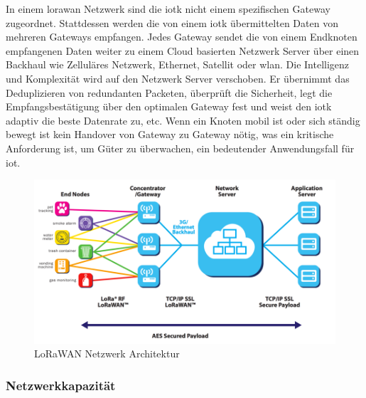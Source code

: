 In einem \gls{lorawan} Netzwerk sind die \gls{iotk} nicht einem spezifischen Gateway zugeordnet. Stattdessen werden die von einem \gls{iotk} übermittelten Daten von mehreren Gateways empfangen. Jedes Gateway sendet die von einem Endknoten empfangenen Daten weiter zu einem Cloud basierten Netzwerk Server über einen Backhaul wie Zelluläres Netzwerk, Ethernet, Satellit oder \gls{wlan}. Die Intelligenz und Komplexität wird auf den Netzwerk Server verschoben. Er übernimmt das Deduplizieren von redundanten Packeten, überprüft die Sicherheit, legt die Empfangsbestätigung über den optimalen Gateway fest und weist den \gls{iotk} adaptiv die beste Datenrate zu, etc. Wenn ein Knoten mobil ist oder sich ständig bewegt ist kein Handover von Gateway zu Gateway nötig, was ein kritische Anforderung ist, um Güter zu überwachen, ein bedeutender Anwendungsfall für \acrshort{iot}.

\begin{figure}[H]
     \centering
        \includegraphics[width=1.0\textwidth]{pictures/lorawan-network-architecture.png}
    \caption{LoRaWAN Netzwerk Architektur}
    \label{fig:LoRaWAN Netzwerk Architektur}
\end{figure}

\subsubsection*{Netzwerkkapazität}

